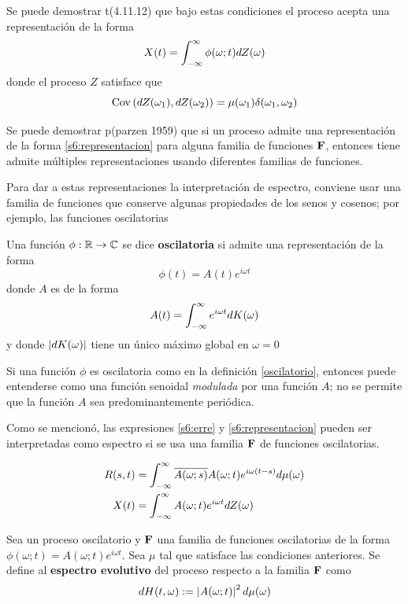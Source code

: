 Se puede demostrar t(4.11.12) que bajo estas condiciones el proceso \xt acepta una representación de la forma 
\begin{equation}
X(t) = \int_{-\infty}^{\infty} \phi(\omega;t) dZ(\omega)
\label{s6:representacion}
\end{equation}
donde el proceso $Z$ satisface que
\begin{equation}
\mathrm{Cov}\left( dZ(\omega_1),dZ(\omega_2) \right) = \mu(\omega_1) \delta(\omega_1, \omega_2)
\end{equation}

Se puede demostrar p(parzen 1959) que si un proceso admite una representación de la forma \ref{s6:representacion} para alguna familia de funciones $\mathbf{F}$, entonces tiene admite múltiples representaciones usando diferentes familias de funciones.

Para dar a estas representaciones la interpretación de espectro, conviene usar una familia de funciones que conserve algunas propiedades de los senos y cosenos; por ejemplo, las funciones oscilatorias

\begin{definicion}
Una función $\phi: \mathbb{R} \rightarrow \mathbb{C}$ se dice \textbf{oscilatoria} si admite una representación de la forma
\begin{equation}
\phi(t) = A(t) e^{i \omega t} 
\end{equation}
donde $A$ es de la forma
\begin{equation}
A(t) = \int_{-\infty}^{\infty} e^{i \omega t} dK(\omega)
\end{equation}
y donde $\left| dK(\omega) \right|$ tiene un único máximo global en $\omega = 0$
\label{oscilatorio}
\end{definicion}

Si una función $\phi$ es oscilatoria como en la definición \ref{oscilatorio}, entonces puede entenderse como una función senoidal \textit{modulada} por una función $A$; no se permite que la función $A$ sea predominantemente periódica.

Como se mencionó, las expresiones \ref{s6:erre} y \ref{s6:representacion} pueden ser interpretadas como espectro si se usa una familia $\mathbf{F}$ de funciones oscilatorias.

\begin{align}
R(s,t) &= \int_{-\infty}^{\infty} \overline{A(\omega; s)} A(\omega; t) e^{i\omega (t-s)} d\mu(\omega) \\
X(t) &= \int_{-\infty}^{\infty} A(\omega; t) e^{i \omega t} dZ(\omega)
\end{align}

\begin{definicion}
Sea \xt un proceso oscilatorio y $\mathbf{F}$ una familia de funciones oscilatorias de la forma
$\phi(\omega;t) = A(\omega;t) e^{i \omega t}$. 
Sea $\mu$ tal que satisface las condiciones anteriores.
Se define al \textbf{espectro evolutivo} del proceso respecto a la familia $\mathbf{F}$ como
\begin{equation}
dH(t,\omega) := \left| A(\omega;t) \right|^{2} d\mu(\omega)
\end{equation}
\label{def:oscilatorio}
\end{definicion}

